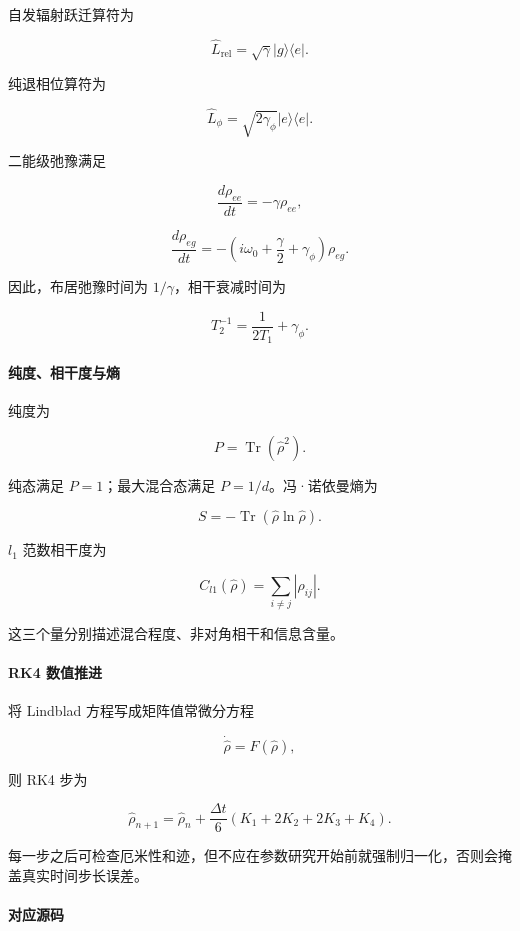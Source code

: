 \documentclass[
]{ctexbook}
\begin{document}
自发辐射跃迁算符为

\[
\hat L_{\mathrm{rel}}=\sqrt{\gamma}|g\rangle\langle e|.
\]

纯退相位算符为

\[
\hat L_{\phi}=\sqrt{2\gamma_\phi}|e\rangle\langle e|.
\]

二能级弛豫满足

\[
\frac{d\rho_{ee}}{dt}
=
-\gamma\rho_{ee},
\]

\[
\frac{d\rho_{eg}}{dt}
=
-\left(i\omega_0+\frac{\gamma}{2}+\gamma_\phi\right)\rho_{eg}.
\]

因此，布居弛豫时间为 \(1/\gamma\)，相干衰减时间为

\[
T_2^{-1}
=
\frac{1}{2T_1}+\gamma_\phi.
\]

\hypertarget{ux7eafux5ea6ux76f8ux5e72ux5ea6ux4e0eux71b5}{%
\paragraph{纯度、相干度与熵}\label{ux7eafux5ea6ux76f8ux5e72ux5ea6ux4e0eux71b5}}

纯度为

\[
P=\operatorname{Tr}(\hat\rho^2).
\]

纯态满足 \(P=1\)；最大混合态满足 \(P=1/d\)。冯·诺依曼熵为

\[
S=-\operatorname{Tr}(\hat\rho\ln\hat\rho).
\]

\(l_1\) 范数相干度为

\[
C_{l1}(\hat\rho)
=
\sum_{i\ne j}|\rho_{ij}|.
\]

这三个量分别描述混合程度、非对角相干和信息含量。

\hypertarget{rk4-ux6570ux503cux63a8ux8fdb}{%
\paragraph{RK4 数值推进}\label{rk4-ux6570ux503cux63a8ux8fdb}}

将 Lindblad 方程写成矩阵值常微分方程

\[
\dot{\hat\rho}=F(\hat\rho),
\]

则 RK4 步为

\[
\hat\rho_{n+1}
=
\hat\rho_n
+
\frac{\Delta t}{6}
(K_1+2K_2+2K_3+K_4).
\]

每一步之后可检查厄米性和迹，但不应在参数研究开始前就强制归一化，否则会掩盖真实时间步长误差。

\hypertarget{ux5bf9ux5e94ux6e90ux7801-22}{%
\paragraph{对应源码}\label{ux5bf9ux5e94ux6e90ux7801-22}}
\end{document}
